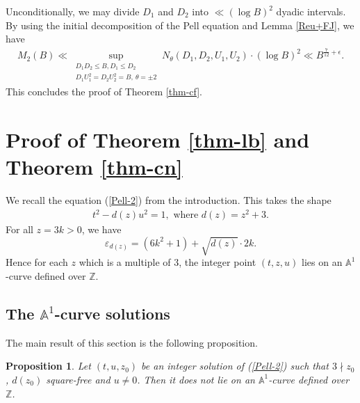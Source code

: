 \documentclass[reqno, 11pt, twoside]{amsart}
\numberwithin{equation}{section}
\newtheorem{prop}[theorem]{Proposition}
\theoremstyle{definition}
\renewcommand{\leq}{\leqslant}
\newcommand{\eps}{\varepsilon}
\newcommand{\AAA}{\mathbb{A}}
\newcommand{\ZZ}{\mathbb{Z}}
\begin{document}
        Unconditionally, we may divide $D_1$ and $D_2$ into $\ll (\log B)^2$ dyadic intervals. By using the initial decomposition of the Pell equation and Lemma \ref{Reu+FJ}, we have
        \begin{align*}
        	M_2(B) 
        	\ll \sup_{\substack{D_1D_2 \leq B, D_1 \leq D_2 \\ D_1U_1^2 = D_2U_2^2 = B, \ \theta = \pm 2}} N_\theta(D_1,D_2,U_1,U_2) \cdot (\log B)^2 \ll B^{\frac{7}{12} + \epsilon}.
        \end{align*}
        This concludes the proof of Theorem \ref{thm-cf}.

\vspace{1em}
\section{Proof of Theorem \ref{thm-lb} and Theorem \ref{thm-cn}}\label{sec3}




We recall the equation (\ref{Pell-2}) from the introduction. This takes the shape
\begin{eqnarray*}
	t^2 - d(z)u^2 = 1, \text{ where } d(z) = z^2 + 3.
\end{eqnarray*}
For all $z = 3k > 0$, we have
$$\eps_{d(z)} = (6k^2 + 1) + \sqrt{d(z)} \cdot 2k.$$
Hence for each $z$ which is a multiple of $3$, the integer point $(t,z,u)$ lies on an $\AAA^1$-curve defined over $\ZZ$. 

\subsection{The $\AAA^1$-curve solutions}

The main result of this section is the following proposition.
\begin{prop}\label{A1-sol}
	Let $(t,u,z_0)$ be an integer solution of (\ref{Pell-2}) such that $3 \nmid z_0$, $d(z_0)$ square-free and $u \neq 0$. Then it does not lie on an $\AAA^1$-curve defined over $\ZZ$.
\end{prop} 
\end{document}
